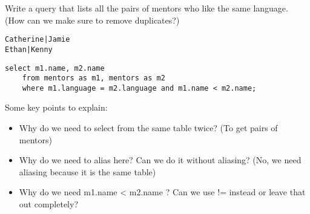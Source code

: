 \begin{blocksection}
\question Write a query that lists all the pairs of mentors who like the same language. (How can we make sure to remove duplicates?)

\begin{lstlisting}
Catherine|Jamie
Ethan|Kenny
\end{lstlisting}

\begin{solution}
\begin{lstlisting}
select m1.name, m2.name
    from mentors as m1, mentors as m2
    where m1.language = m2.language and m1.name < m2.name;
\end{lstlisting}
\end{solution}
\end{blocksection}

\begin{guide}
Some key points to explain:
\begin{itemize}
	\item Why do we need to select from the same table twice? (To get pairs of mentors)
	\item Why do we need to alias here? Can we do it without aliasing? (No, we need aliasing because it is the same table)
	\item Why do we need m1.name < m2.name ? Can we use != instead or leave that out completely?
\end{itemize}
\end{guide}